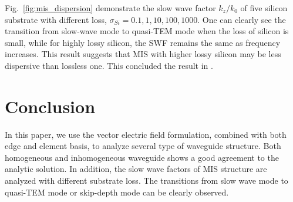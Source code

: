 \documentclass{pj}
\begin{document}
Fig.~\ref{fig:mis_dispersion} demonstrate the slow wave factor $k_z/k_0$ of five silicon substrate with different loss, $\sigma_{Si}=0.1,1,10,100,1000$. One can clearly see the transition from slow-wave mode to quasi-TEM mode when the loss of silicon is small, while for highly lossy silicon, the SWF remains the same as frequency increases. This result suggests that MIS with higher lossy silicon may be less dispersive than lossless one. This concluded the result in \cite{OC_XiaoJ_LiS_2012_lowloss_metalinsulatorsemiconductor}.

\section{Conclusion}
In this paper, we use the vector electric field formulation, combined with both edge and element basis, to analyze several type of waveguide structure. Both homogeneous and inhomogeneous  waveguide shows a good agreement to the analytic solution. In addition, the slow wave factors of MIS structure are analyzed with different substrate loss. The transitions from slow wave mode to quasi-TEM mode or skip-depth mode can be clearly observed. 





%
\end{document}
